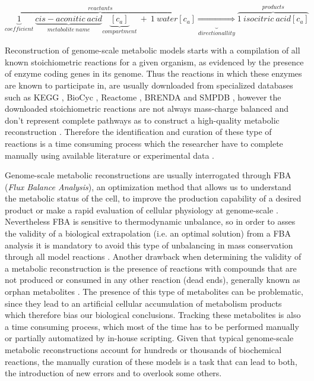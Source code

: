 \begin{equation}
\label{sr}
\overbrace{\underbrace{1}_{coefficient}\ \underbrace{cis-aconitic\ acid}_{metabolite\ name}\underbrace{[c_a]}_{compartment}\ +\ 1\ water[c_a]}^{reactants} \underbrace{\Rightarrow}_{directionallity} \overbrace{1\ isocitric\ acid[c_a]}^{products}
\end{equation}

Reconstruction of genome-scale metabolic models starts with a compilation of all known stoichiometric reactions for a given organism, as evidenced by the presence of enzyme coding genes in its genome. Thus the reactions in which these enzymes are known to  participate in, are usually downloaded from specialized databases such as KEGG \citep{Kanehisa2000}, BioCyc \citep{Caspi2014}, Reactome \citep{Croft2014}, BRENDA \citep{Chang2015} and SMPDB \citep{Jewison2014}, however the downloaded stoichiometric reactions are not always mass-charge balanced and don't represent complete pathways as to construct a high-quality metabolic reconstruction \citep{Thiele2010, Gevorgyan2008}. Therefore the identification and curation of these type of reactions is a time consuming process which  the researcher have to complete manually using available literature or experimental data \citep{Lakshmanan2014}.

Genome-scale metabolic reconstructions are usually interrogated through FBA (\emph{Flux Balance Analysis}), an optimization method that allows us to understand the metabolic status of the cell, to improve the production capability of a desired product or make a rapid evaluation of cellular physiology at genome-scale \citep{Kim2008,Park2009}. Nevertheless FBA is sensitive to thermodynamic unbalance, so in order to asses the validity of a biological extrapolation (i.e. an optimal solution) from a FBA analysis it is mandatory to avoid this type of unbalancing in mass conservation through all model reactions \citep{Reznik2013}. Another drawback when determining  the validity of a metabolic reconstruction is the presence of  reactions with compounds that are not produced or consumed in any other reaction (dead ends), generally known as orphan metabolites  \citep{Park2009, Thiele2010}. The presence of this type of metabolites can be problematic, since they lead to an artificial cellular  accumulation of  metabolism products which therefore  bias our biological conclusions. Tracking these metabolites is also a time consuming process, which most of the time has to be performed manually or partially automatized by in-house scripting. Given that typical genome-scale metabolic reconstructions account for hundreds or thousands of biochemical reactions, the manually curation of these models is a task that can lead to both, the introduction of new errors and to overlook some others.

